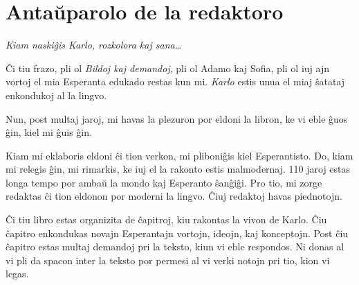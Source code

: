 \section*{Antaŭparolo de la redaktoro}

\noindent\emph{Kiam naskiĝis Karlo, rozkolora kaj sana\ldots{}}

\vspace{1em}

    Ĉi tiu frazo, pli ol \emph{Bildoj kaj demandoj}, pli ol Adamo kaj Sofia, pli ol iuj ajn vortoj el mia Esperanta edukado restas kun mi. \emph{Karlo} estis unua el miaj ŝatataj enkondukoj al la lingvo.

    Nun, post multaj jaroj, mi havas la plezuron por eldoni la libron, ke vi eble ĝuos ĝin, kiel mi ĝuis ĝin.

Kiam mi eklaboris eldoni ĉi tion verkon, mi pliboniĝis kiel Esperantisto. Do, kiam mi relegis ĝin, mi rimarkis, ke iuj el la rakonto estis malmodernaj. 110 jaroj estas longa tempo por ambaŭ la mondo kaj Esperanto ŝanĝiĝi. Pro tio, mi zorge redaktas ĉi tion eldonon por moderni la lingvo. Ĉiuj redaktoj havas piednotojn.

%
    Ĉi tiu libro estas organizita de ĉapitroj, kiu rakontas la vivon de Karlo. Ĉiu ĉapitro enkondukas novajn Esperantajn vortojn, ideojn, kaj konceptojn. Post ĉiu ĉapitro estas multaj demandoj pri la teksto, kiun vi eble respondos. Ni donas al vi pli da spacon inter la teksto por permesi al vi verki notojn pri tio, kion vi legas.

